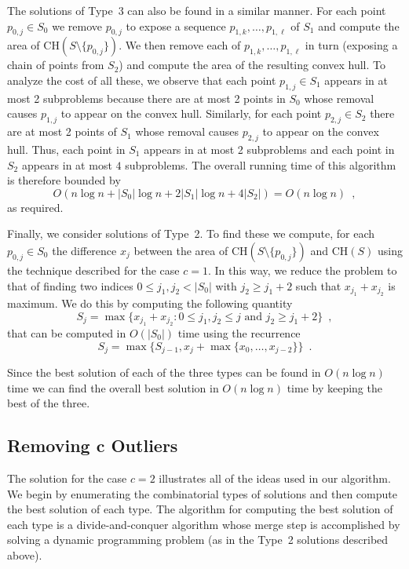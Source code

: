 \documentclass[lotsofwhite]{patmorin}
\newcommand{\ch}{\mathrm{CH}}
\begin{document}
The solutions of Type~3 can also be found in a similar manner.  For
each point $p_{0,j}\in S_0$ we remove $p_{0,j}$ to expose a sequence
$p_{1,k},\ldots,p_{1,\ell}$ of $S_1$ and compute the area of
$\ch(S\setminus\{p_{0,j}\})$.  We then remove each of
$p_{1,k},\ldots,p_{1,\ell}$ in turn (exposing a chain of points from
$S_2$) and compute the area of the resulting convex hull.  To analyze
the cost of all these, we observe that each point $p_{1,j}\in S_1$
appears in at most 2 subproblems because there are at most 2 points in
$S_0$ whose removal causes $p_{1,j}$ to appear on the convex hull.
Similarly, for each point $p_{2,j}\in S_2$ there are at most 2 points
of $S_1$ whose removal causes $p_{2,j}$ to appear on the convex hull.
Thus, each point in $S_1$ appears in at most 2 subproblems and each
point in $S_2$ appears in at most $4$ subproblems.  The overall
running time of this algorithm is therefore bounded by
\[
    O\left(n\log n + |S_0|\log n + 2|S_1|\log n + 4|S_2|\right) = O(n\log n) \enspace ,
\]
as required.

Finally, we consider solutions of Type~2.  To find these we compute,
for each $p_{0,j}\in S_0$ the difference $x_j$ between the area of
$\ch(S\setminus\{p_{0,j}\})$ and $\ch(S)$ using the technique
described for the case $c=1$.  In this way, we reduce the problem to
that of finding two indices $0\le j_1,j_2< |S_0|$ with $j_2\ge j_1+2$
such that $x_{j_1}+x_{j_2}$ is maximum.  We do this by computing the
following quantity
\[
     S_j = \max\{x_{j_1}+x_{j_2} :
       \mbox{$0\le j_1,j_2\le j$ and $j_2 \ge j_1+2$}\} \enspace ,
\]
that can be computed in $O(|S_0|)$ time using the recurrence
\[
    S_j = \max\{S_{j-1}, x_{j} + \max\{x_{0},\ldots,x_{j-2}\}\}
                \enspace .
\]

Since the best solution of each of the three types can be found in
$O(n\log n)$ time we can find the overall best solution in $O(n\log
n)$ time by keeping the best of the three.

\subsection{Removing $\mathbf{c}$ Outliers}

The solution for the case $c=2$ illustrates all of the ideas used in 
our algorithm.  We begin by enumerating the combinatorial types of
solutions and then compute the best solution of each type.  The
algorithm for computing the best solution of each type is a
divide-and-conquer algorithm whose merge step is accomplished by
solving a dynamic programming problem (as in the Type~2 solutions
described above).
\end{document}
